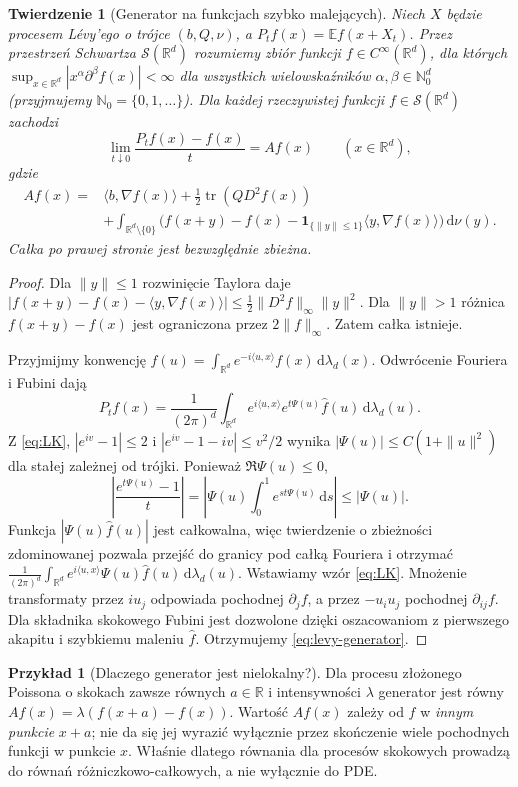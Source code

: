 \documentclass[11pt,a4paper,oneside]{report}
\numberwithin{equation}{chapter}
\theoremstyle{plain}
\newtheorem{twierdzenie}{Twierdzenie}[chapter]
\theoremstyle{definition}
\newtheorem{przyklad}{Przykład}[chapter]
\theoremstyle{remark}
\newcommand{\R}{\mathbb{R}}
\newcommand{\N}{\mathbb{N}}
\newcommand{\E}{\mathbb{E}}
\newcommand{\calS}{\mathcal{S}}
\newcommand{\ind}[1]{\mathbf{1}_{#1}}
\newcommand{\dd}{\mathrm{d}}
\begin{document}
\begin{twierdzenie}[Generator na funkcjach szybko malejących]\label{thm:volIII:10:05}
\label{th:levy-generator}
Niech $X$ będzie procesem Lévy'ego o trójce $(b,Q,\nu)$,
a $P_tf(x)=\E f(x+X_t)$. Przez \emph{przestrzeń Schwartza}
$\calS(\R^d)$ rozumiemy zbiór funkcji $f\in C^\infty(\R^d)$,
dla których $\sup_{x\in\R^d}|x^\alpha\partial^\beta f(x)|<\infty$
dla wszystkich wielowskaźników $\alpha,\beta\in\N_0^d$
(przyjmujemy $\N_0=\{0,1,\ldots\}$).
Dla każdej rzeczywistej funkcji $f\in\calS(\R^d)$ zachodzi
\[
\lim_{t\downarrow0}\frac{P_tf(x)-f(x)}{t}=Af(x)
\qquad (x\in\R^d),
\]
gdzie
\[
\begin{split}
Af(x)={}&\langle b,\nabla f(x)\rangle
+\frac12\operatorname{tr}(QD^2f(x))\\
&+\int_{\R^d\setminus\{0\}}
\bigl(f(x+y)-f(x)
-\ind{\{\|y\|\le1\}}\langle y,\nabla f(x)\rangle\bigr)
\,\dd\nu(y).
\end{split}
\tag{10.5}\label{eq:levy-generator}
\]
Całka po prawej stronie jest bezwzględnie zbieżna.
\end{twierdzenie}
\begin{proof}
Dla $\|y\|\le1$ rozwinięcie Taylora daje
$|f(x+y)-f(x)-\langle y,\nabla f(x)\rangle|
\le\frac12\|D^2f\|_\infty\|y\|^2$.
Dla $\|y\|>1$ różnica $f(x+y)-f(x)$ jest ograniczona
przez $2\|f\|_\infty$. Zatem całka istnieje.

Przyjmijmy konwencję
$\widehat f(u)=\int_{\R^d}e^{-i\langle u,x\rangle}
 f(x)\,\dd\lambda_d(x)$.
Odwrócenie Fouriera i Fubini dają
\[
P_tf(x)=\frac{1}{(2\pi)^d}\int_{\R^d}
 e^{i\langle u,x\rangle}e^{t\Psi(u)}\widehat f(u)
\,\dd\lambda_d(u).
\]
Z \eqref{eq:LK}, $|e^{iv}-1|\le2$ i
$|e^{iv}-1-iv|\le v^2/2$ wynika
$|\Psi(u)|\le C(1+\|u\|^2)$ dla stałej zależnej
od trójki. Ponieważ $\Re\Psi(u)\le0$,
\[
\left|\frac{e^{t\Psi(u)}-1}{t}\right|
=\left|\Psi(u)\int_0^1e^{st\Psi(u)}\,\dd s\right|
\le|\Psi(u)|.
\]
Funkcja $|\Psi(u)\widehat f(u)|$ jest całkowalna,
więc twierdzenie o zbieżności zdominowanej pozwala
przejść do granicy pod całką Fouriera i otrzymać
$\frac1{(2\pi)^d}\int_{\R^d} e^{i\langle u,x\rangle}
\Psi(u)\widehat f(u)\,\dd\lambda_d(u)$.
Wstawiamy wzór \eqref{eq:LK}. Mnożenie transformaty
przez $iu_j$ odpowiada pochodnej $\partial_j f$, a
przez $-u_i u_j$ pochodnej $\partial_{ij}f$.
Dla składnika skokowego Fubini jest dozwolone dzięki
oszacowaniom z pierwszego akapitu i szybkiemu maleniu
$\widehat f$. Otrzymujemy \eqref{eq:levy-generator}.
\end{proof}

\begin{przyklad}[Dlaczego generator jest nielokalny?]
Dla procesu złożonego Poissona o skokach zawsze równych
$a\in\R$ i intensywności $\lambda$ generator jest równy
$Af(x)=\lambda(f(x+a)-f(x))$.
Wartość $Af(x)$ zależy od $f$ w \emph{innym punkcie} $x+a$;
nie da się jej wyrazić wyłącznie przez skończenie wiele
pochodnych funkcji w punkcie $x$. Właśnie dlatego
równania dla procesów skokowych prowadzą do równań
różniczkowo-całkowych, a nie wyłącznie do PDE.
\end{przyklad}
\end{document}
